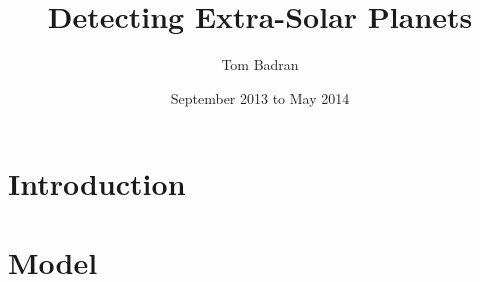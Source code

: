 \documentclass{article}
\title{Detecting Extra-Solar Planets}
\author{Tom Badran}
\date{September 2013 to May 2014}
\numberwithin{equation}{section}
\begin{document}
\maketitle

\tableofcontents

\begin{abstract}

\end{abstract}

\section{Introduction}


\section{Model}



\end{document}
